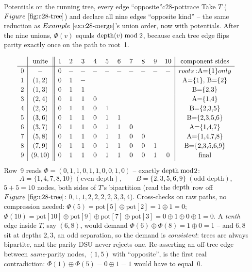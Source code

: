 \begin{example}{Potentials on the running tree, every edge ``opposite''}{c28-pottrace}
Take \(T\) (\(\figref{c28-tree}\)) and declare all nine edges ``opposite
kind'' -- the same reduction as \(\exref{c28-merge}\)'s union order, now with
potentials.  After the nine unions, \(\Phi(v)\) equals \(\operatorname{depth}(v)\bmod 2\),
because each tree edge flips parity exactly once on the path to root~1.
\end{example}
\begin{tracebox}
\[
\renewcommand{\arraystretch}{1.15}
\begin{array}{c|c||cccccccccc|c}
 & \text{unite} & 1&2&3&4&5&6&7&8&9&10 & \text{component sides}\\ \hline
0 & - & 0&-&-&-&-&-&-&-&-&- & roots: $A=\{1\}$ only\\
1 &(1,2) & 0&1&-&&&&&&& & $A=\{1\}$,\ $B=\{2\}$\\
2 &(1,3) & 0&1&1&&&&&&& & $B=\{2,3\}$\\
3 &(2,4) & 0&1&1&0&&&&&& & $A=\{1,4\}$\\
4 &(2,5) & 0&1&1&0&1&&&&& & $B=\{2,3,5\}$\\
5 &(3,6) & 0&1&1&0&1&1&&&& & $B=\{2,3,5,6\}$\\
6 &(3,7) & 0&1&1&0&1&1&0&&& & $A=\{1,4,7\}$\\
7 &(5,8) & 0&1&1&0&1&1&0&0&& & $A=\{1,4,7,8\}$\\
8 &(7,9) & 0&1&1&0&1&1&0&0&1& & $B=\{2,3,5,6,9\}$\\
9 &(9,10)& 0&1&1&0&1&1&0&0&1&0& \text{final}\\
[2pt]
\end{array}
\]
Row~9 reads $\Phi=(0,1,1,0,1,1,0,0,1,0)$ -- exactly $\operatorname{depth}\bmod 2$:
\[
  A=\{1,4,7,8,10\}\;(\text{even depth}),\qquad
  B=\{2,3,5,6,9\}\;(\text{odd depth}),
\]
$5+5=10$ nodes, both sides of $T$'s bipartition (read the $\operatorname{depth}$ row off
$\figref{c28-tree}$: $0,1,1,2,2,2,2,3,3,4$).  Cross-checks on raw paths, no
compression needed:
$\Phi(5)=\text{pot}[5]\oplus\text{pot}[2]=1\oplus1=0$;
$\Phi(10)=\text{pot}[10]\oplus\text{pot}[9]\oplus\text{pot}[7]\oplus\text{pot}[3]=0\oplus1\oplus0\oplus1=0$.
A \emph{tenth} edge inside $T$, say $(6,8)$, would demand
$\Phi(6)\oplus\Phi(8)=1\oplus0=1$ -- and $6,8$ sit at depths $2,3$, an odd
separation, so the demand is \emph{consistent}: trees are always bipartite,
and the parity DSU never rejects one.  Re-asserting an off-tree edge between
\emph{same}-parity nodes, $(1,5)$ with ``opposite'', is the first real
contradiction: $\Phi(1)\oplus\Phi(5)=0\oplus1=1$ would have to equal~$0$.
\end{tracebox}

